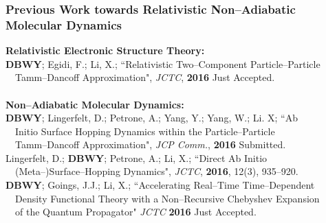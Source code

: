 \documentclass[usepdftitle=false,10pt]{beamer}
\begin{document}
\begin{frame}
  \frametitle{Previous Work towards Relativistic Non--Adiabatic Molecular Dynamics}

  {\Large \bf Relativistic Electronic Structure Theory:}\vspace{0.1cm}\\

  \textbf{DBWY}; Egidi, F.; Li, X.; ``Relativistic Two--Component Particle--Particle
    \\$\quad$Tamm--Dancoff Approximation", \emph{JCTC}, \textbf{2016} Just Accepted.\\

  ~\\
  {\Large \bf Non--Adiabatic Molecular Dynamics:}\vspace{0.1cm}\\

  \textbf{DBWY}; Lingerfelt, D.; Petrone, A.; Yang, Y.; Yang, W.; Li. X;
    ``Ab \\$\quad$Initio Surface Hopping Dynamics within the Particle--Particle
    \\$\quad$Tamm--Dancoff Approximation", \emph{JCP Comm.}, \textbf{2016} Submitted.\\\vspace{0.20cm}
  Lingerfelt, D.; \textbf{DBWY}; Petrone, A.; Li, X.; ``Direct Ab Initio
    \\$\quad$(Meta--)Surface--Hopping Dynamics", \emph{JCTC}, \textbf{2016}, 12(3),
    935--920.\\\vspace{0.20cm}
  \textbf{DBWY}; Goings, J.J.; Li, X.; ``Accelerating Real--Time Time--Dependent
    \\$\quad$Density Functional Theory with a Non--Recursive Chebyshev Expansion 
    \\$\quad$of the Quantum Propagator" \emph{JCTC} \textbf{2016} Just Accepted.

\end{frame}
\end{document}
